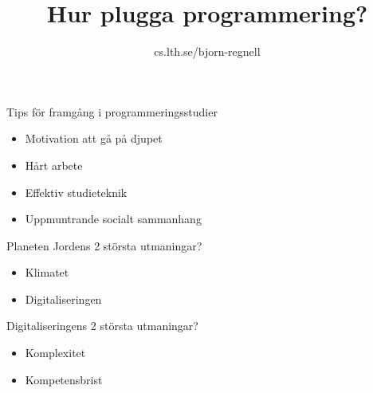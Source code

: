 \documentclass{lecturesimple}
\title{Hur plugga programmering?}
\author{cs.lth.se/bjorn-regnell}
\institute{}
\date{\DateOfShow}
\begin{document}
\frame{\titlepage}


\begin{Slide}{Tips för framgång i programmeringsstudier}
  \begin{itemize}
    \item Motivation att gå på djupet
    \item Hårt arbete
    \item Effektiv studieteknik
    \item Uppmuntrande socialt sammanhang
  \end{itemize}  
\end{Slide}



\begin{Slide}{Planeten Jordens 2 största utmaningar?}
  \begin{itemize}
    \item Klimatet
    \item Digitaliseringen 
  \end{itemize}
\end{Slide}

\begin{Slide}{Digitaliseringens 2 största utmaningar?}
  \begin{itemize}
    \item Komplexitet
    \item Kompetensbrist 
  \end{itemize}  
\end{Slide}

\end{document}
